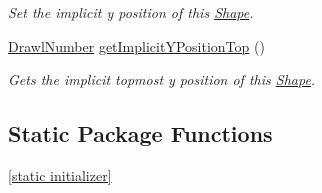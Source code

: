 \begin{DoxyCompactItemize}
\begin{DoxyCompactList}\small\item\em Set the implicit y position of this \hyperlink{classcom_1_1aarrelaakso_1_1drawl_1_1_shape}{Shape}. \end{DoxyCompactList}\item 
\hyperlink{classcom_1_1aarrelaakso_1_1drawl_1_1_drawl_number}{Drawl\+Number} \hyperlink{classcom_1_1aarrelaakso_1_1drawl_1_1_shape_afb64d51ac2023ad770bbc8f37061d5b0}{get\+Implicit\+Y\+Position\+Top} ()
\begin{DoxyCompactList}\small\item\em Gets the implicit topmost y position of this \hyperlink{classcom_1_1aarrelaakso_1_1drawl_1_1_shape}{Shape}. \end{DoxyCompactList}\end{DoxyCompactItemize}
\subsection*{Static Package Functions}
\begin{DoxyCompactItemize}
\item 
\hyperlink{classcom_1_1aarrelaakso_1_1drawl_1_1_shape_ad2adcb85374cf5d6d59429628314e8d1}{\mbox{[}static initializer\mbox{]}}
\end{DoxyCompactItemize}
